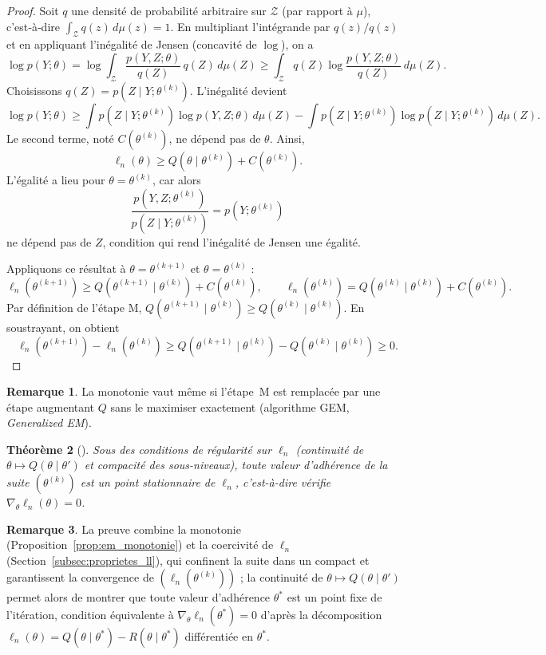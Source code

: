 \documentclass[12pt, a4paper]{article}
\newtheorem{theorem}{Théorème}[section]
\theoremstyle{definition}
\newtheorem{remark}[theorem]{Remarque}
\begin{document}
\begin{proof}
Soit $q$ une densité de probabilité arbitraire sur $\mathcal{Z}$ (par rapport à $\mu$), c’est‑à‑dire $\int_{\mathcal{Z}} q(z)\,d\mu(z)=1$. En multipliant l’intégrande par $q(z)/q(z)$ et en appliquant l’inégalité de Jensen (concavité de $\log$), on a
\[
\log p(Y;\theta) = \log \int_{\mathcal{Z}} \frac{p(Y,Z;\theta)}{q(Z)}\, q(Z)\,d\mu(Z)
\ge \int_{\mathcal{Z}} q(Z) \log\frac{p(Y,Z;\theta)}{q(Z)}\,d\mu(Z).
\]
Choisissons $q(Z) = p(Z\mid Y;\theta^{(k)})$. L’inégalité devient
\[
\log p(Y;\theta) \ge \int p(Z\mid Y;\theta^{(k)}) \log p(Y,Z;\theta)\,d\mu(Z)
- \int p(Z\mid Y;\theta^{(k)}) \log p(Z\mid Y;\theta^{(k)})\,d\mu(Z).
\]
Le second terme, noté $C(\theta^{(k)})$, ne dépend pas de $\theta$. Ainsi,
\[
\ell_n(\theta) \ge Q(\theta\mid\theta^{(k)}) + C(\theta^{(k)}).
\]
L’égalité a lieu pour $\theta = \theta^{(k)}$, car alors
\[
\frac{p(Y,Z;\theta^{(k)})}{p(Z\mid Y;\theta^{(k)})} = p(Y;\theta^{(k)})
\]
ne dépend pas de $Z$, condition qui rend l’inégalité de Jensen une égalité.

Appliquons ce résultat à $\theta = \theta^{(k+1)}$ et $\theta = \theta^{(k)}$ :
\[
\ell_n(\theta^{(k+1)}) \ge Q(\theta^{(k+1)}\mid\theta^{(k)}) + C(\theta^{(k)}), \qquad
\ell_n(\theta^{(k)}) = Q(\theta^{(k)}\mid\theta^{(k)}) + C(\theta^{(k)}).
\]
Par définition de l’étape M, $Q(\theta^{(k+1)}\mid\theta^{(k)}) \ge Q(\theta^{(k)}\mid\theta^{(k)})$. En soustrayant, on obtient
\[
\ell_n(\theta^{(k+1)}) - \ell_n(\theta^{(k)}) \ge Q(\theta^{(k+1)}\mid\theta^{(k)}) - Q(\theta^{(k)}\mid\theta^{(k)}) \ge 0.
\]
\end{proof}

\begin{remark}
La monotonie vaut même si l'étape~M est remplacée par une étape augmentant $Q$ sans le maximiser exactement (algorithme GEM, \emph{Generalized EM}).
\end{remark}

\begin{theorem}[\cite{wu1983convergence}]
\label{thm:wu}
Sous des conditions de régularité sur $\ell_n$ (continuité de $\theta \mapsto Q(\theta \mid \theta')$ et compacité des sous-niveaux), toute valeur d'adhérence de la suite $(\theta^{(k)})$ est un point stationnaire de $\ell_n$, c'est-à-dire vérifie $\nabla_\theta\ell_n(\theta) = 0$.
\end{theorem}

\begin{remark}
La preuve combine la monotonie (Proposition~\ref{prop:em_monotonie}) et la coercivité de $\ell_n$ (Section~\ref{subsec:proprietes_ll}), qui confinent la suite dans un compact et garantissent la convergence de $(\ell_n(\theta^{(k)}))$ ; la continuité de $\theta \mapsto Q(\theta \mid \theta')$ permet alors de montrer que toute valeur d'adhérence $\theta^*$ est un point fixe de l'itération, condition équivalente à $\nabla_\theta \ell_n(\theta^*) = 0$ d'après la décomposition $\ell_n(\theta) = Q(\theta \mid \theta^*) - R(\theta \mid \theta^*)$ différentiée en $\theta^*$.
\end{remark}
\end{document}
